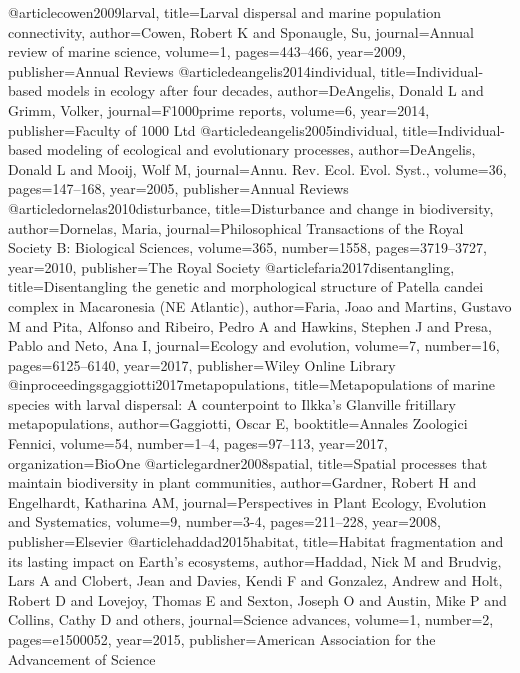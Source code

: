 @article{cowen2009larval,
	title={Larval dispersal and marine population connectivity},
	author={Cowen, Robert K and Sponaugle, Su},
	journal={Annual review of marine science},
	volume={1},
	pages={443--466},
	year={2009},
	publisher={Annual Reviews}
}
@article{deangelis2014individual,
	title={Individual-based models in ecology after four decades},
	author={DeAngelis, Donald L and Grimm, Volker},
	journal={F1000prime reports},
	volume={6},
	year={2014},
	publisher={Faculty of 1000 Ltd}
}
@article{deangelis2005individual,
	title={Individual-based modeling of ecological and evolutionary processes},
	author={DeAngelis, Donald L and Mooij, Wolf M},
	journal={Annu. Rev. Ecol. Evol. Syst.},
	volume={36},
	pages={147--168},
	year={2005},
	publisher={Annual Reviews}
}
@article{dornelas2010disturbance,
	title={Disturbance and change in biodiversity},
	author={Dornelas, Maria},
	journal={Philosophical Transactions of the Royal Society B: Biological Sciences},
	volume={365},
	number={1558},
	pages={3719--3727},
	year={2010},
	publisher={The Royal Society}
}
@article{faria2017disentangling,
	title={Disentangling the genetic and morphological structure of Patella candei complex in Macaronesia (NE Atlantic)},
	author={Faria, Joao and Martins, Gustavo M and Pita, Alfonso and Ribeiro, Pedro A and Hawkins, Stephen J and Presa, Pablo and Neto, Ana I},
	journal={Ecology and evolution},
	volume={7},
	number={16},
	pages={6125--6140},
	year={2017},
	publisher={Wiley Online Library}
}
@inproceedings{gaggiotti2017metapopulations,
	title={Metapopulations of marine species with larval dispersal: A counterpoint to Ilkka's Glanville fritillary metapopulations},
	author={Gaggiotti, Oscar E},
	booktitle={Annales Zoologici Fennici},
	volume={54},
	number={1--4},
	pages={97--113},
	year={2017},
	organization={BioOne}
}
@article{gardner2008spatial,
	title={Spatial processes that maintain biodiversity in plant communities},
	author={Gardner, Robert H and Engelhardt, Katharina AM},
	journal={Perspectives in Plant Ecology, Evolution and Systematics},
	volume={9},
	number={3-4},
	pages={211--228},
	year={2008},
	publisher={Elsevier}
}
@article{haddad2015habitat,
	title={Habitat fragmentation and its lasting impact on Earth’s ecosystems},
	author={Haddad, Nick M and Brudvig, Lars A and Clobert, Jean and Davies, Kendi F and Gonzalez, Andrew and Holt, Robert D and Lovejoy, Thomas E and Sexton, Joseph O and Austin, Mike P and Collins, Cathy D and others},
	journal={Science advances},
	volume={1},
	number={2},
	pages={e1500052},
	year={2015},
	publisher={American Association for the Advancement of Science}
}
